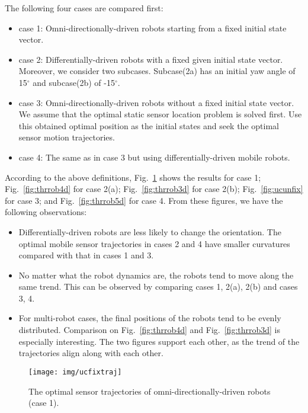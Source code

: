     The following four cases are compared first:
    \begin{itemize}
        \item case 1: Omni-directionally-driven robots starting from a fixed initial state vector.
        \item case 2: Differentially-driven robots with a fixed given initial state vector. Moreover, we consider two subcases. Subcase(2a) has an initial yaw angle of 15$^\circ$ and   subcase(2b) of  -15$^\circ$.
        \item case 3: Omni-directionally-driven robots without a fixed initial state vector. We assume that the optimal static sensor location problem is solved first. Use this  obtained optimal position  as the initial states and seek the optimal sensor motion trajectories.
        \item case 4: The same as in case 3 but using differentially-driven mobile robots.
       \end{itemize}
According to the above definitions, Fig.~\ref{fig:ucfix} shows the results for case 1; Fig.~\ref{fig:thrrob4d} for case 2(a); Fig.~\ref{fig:thrrob3d} for case 2(b); Fig.~\ref{fig:ucunfix} for case 3; and Fig.~\ref{fig:thrrob5d} for case 4. From these figures, we have the following observations:
\begin{itemize}
    \item Differentially-driven robots are less likely to change the orientation. The optimal mobile sensor trajectories in cases 2 and 4 have smaller curvatures compared with that in cases 1 and 3.
    \item No matter what the robot dynamics are, the robots tend to move along the same trend. This can be observed by comparing cases 1, 2(a), 2(b) and cases 3, 4.
    \item For multi-robot cases, the final positions of the robots tend to be evenly distributed. Comparison on Fig.~\ref{fig:thrrob4d} and Fig.~\ref{fig:thrrob3d} is especially interesting. The two figures support each other, as the trend of the trajectories align along with each other.
   \end{itemize}

\begin{figure}
    \centering
  \texttt{[image: img/ucfixtraj]}\\
  \caption{The optimal sensor trajectories of omni-directionally-driven robots (case 1).}\label{fig:ucfix}
\end{figure}


